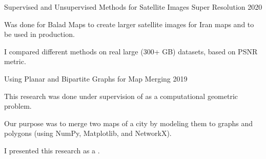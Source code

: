 \begin{cvprojects}
  \cvproject
    {Supervised and Unsupervised Methods for Satellite Images Super Resolution} %
    {} %
    {} %
    {2020} %
    {
      \begin{cvitems} %
        \item {Was done for Balad Maps to create larger satellite images for Iran maps and to be used in production.}
        \item {I compared different methods on real large (300+ GB) datasets, based on PSNR metric.}
      \end{cvitems}
    }

  \cvproject
    {Using Planar and Bipartite Graphs for Map Merging} %
    {} %
    {} %
    {2019} %
    {
      \begin{cvitems} %
        \item {This research was done under supervision of  as a computational geometric problem.}
        \item {Our purpose was to merge two maps of a city by modeling them to graphs and polygons (using NumPy, Matplotlib, and NetworkX).}
        \item {I presented this research as a .}
      \end{cvitems}
    }

\end{cvprojects}